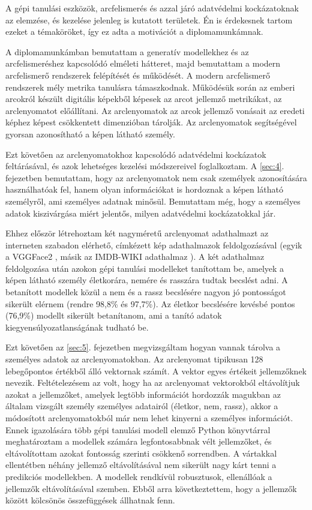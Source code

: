 A gépi tanulási eszközök, arcfelismerés és azzal járó adatvédelmi kockázatoknak az elemzése, és kezelése jelenleg is kutatott területek. Én is érdekesnek tartom ezeket a témaköröket, így ez adta a motivációt a diplomamunkámnak. 

A diplomamunkámban bemutattam a generatív modellekhez és az arcfelismeréshez kapcsolódó elméleti hátteret, majd bemutattam a modern arcfelismerő rendszerek felépítését és működését. A modern arcfelismerő rendszerek mély metrika tanulásra támaszkodnak. Működésük során az emberi arcokról készült digitális képekből képesek az arcot jellemző metrikákat, az arclenyomatot előállítani. Az arclenyomatok az arcok jellemző vonásait az eredeti képhez képest csökkentett dimenzióban tárolják. Az arclenyomatok segítségével gyorsan azonosítható a képen látható személy.

Ezt követően az arclenyomatokhoz kapcsolódó adatvédelmi kockázatok feltárásával, és azok lehetséges kezelési módszereivel foglalkoztam. A \ref{sec:4}. fejezetben bemutattam, hogy az arclenyomatok nem csak személyek azonosítására használhatóak fel, hanem olyan információkat is hordoznak a képen látható személyről, ami személyes adatnak minősül. Bemutattam még, hogy a személyes adatok kiszivárgása miért jelentős, milyen adatvédelmi kockázatokkal jár.

Ehhez először létrehoztam két nagyméretű arclenyomat adathalmazt az interneten szabadon elérhető, címkézett kép adathalmazok feldolgozásával (egyik a VGGFace2 \cite{vggface22018}, másik az IMDB-WIKI adathalmaz \cite{imdbwiki2018}). A két adathalmaz feldolgozása után azokon gépi tanulási modelleket tanítottam be, amelyek a képen látható személy életkorára, nemére és rasszára tudtak becslést adni. A betanított modellek közül a nem és a rassz becslésére nagyon jó pontosságot sikerült elérnem (rendre 98,8\% és 97,7\%). Az életkor becslésére kevésbé pontos (76,9\%) modellt sikerült betanítanom, ami a tanító adatok kiegyensúlyozatlanságának tudható be.

Ezt követően az \ref{sec:5}. fejezetben megvizsgáltam hogyan vannak tárolva a személyes adatok az arclenyomatokban. Az arclenyomat tipikusan 128 lebegőpontos értékből álló vektornak számít. A vektor egyes értékeit jellemzőknek nevezik. Feltételezésem az volt, hogy ha az arclenyomat vektorokból eltávolítjuk azokat a jellemzőket, amelyek legtöbb információt hordozzák magukban az általam vizsgált személy személyes adatairól (életkor, nem, rassz), akkor a módosított arclenyomatokból már nem lehet kinyerni a személyes információt. Ennek igazolására több gépi tanulási modell elemző Python könyvtárral meghatároztam a modellek számára legfontosabbnak vélt jellemzőket, és eltávolítottam azokat fontosság szerinti csökkenő sorrendben. A vártakkal ellentétben néhány jellemző eltávolításával nem sikerült nagy kárt tenni a predikciós modellekben. A modellek rendkívül robusztusok, ellenállóak a jellemzők eltávolításával szemben. Ebből arra következtettem, hogy a jellemzők között kölcsönös összefüggések állhatnak fenn.

